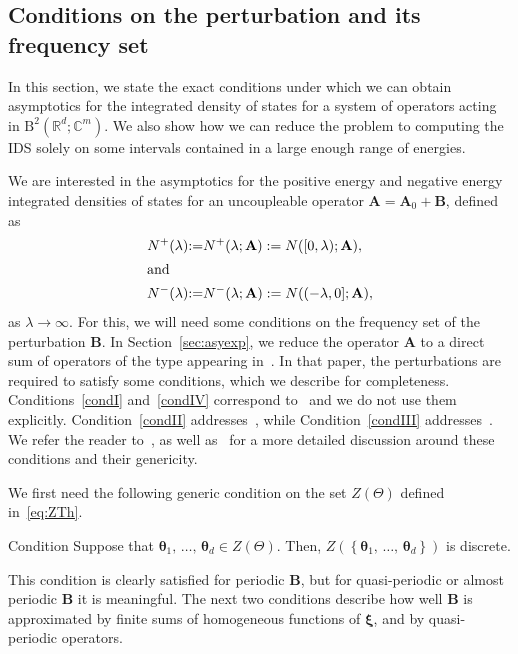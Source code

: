 \documentclass[10pt]{amsart}
\theoremstyle{definition}\newtheorem{defi}[theo]{Definition}\newtheorem{rema}[theo]{Remark}\newtheorem{exam}[theo]{Example}\newtheorem{nota}[theo]{Notation}
\newcommand{\RB}{\mathrm{B}}
\newcommand{\R}{\mathbb R}
\newcommand{\C}{\mathbb C}
\newcommand{\btheta}{\boldsymbol \theta}
\newcommand{\bxi}{\boldsymbol \xi}
\newcommand{\BA}{\mathbf A}
\newcommand{\BB}{\mathbf B}
\newcommand{\pd}{uncoupleable}
\newcommand{\set}[1]{\left\{ #1 \right\}}
\begin{document}
\subsection{Conditions on the perturbation and its frequency set}\label{sec:prelim}

In this section, we state the exact conditions under which we can obtain asymptotics for the integrated density of states for a system of operators acting in $\RB^2(\R^d;\C^m)$. We also show how we can reduce the problem to computing the IDS solely on some intervals contained in a large enough range of energies.


We are interested in the asymptotics for the positive energy and negative energy integrated densities of states for an \pd{} operator $\BA = \BA_0 + \BB$, defined as
\begin{align}
N^+(\lambda) &{:=} N^+(\lambda;\BA) := N([0,\lambda);\BA),\label{eq:npositive}
\\
\intertext{and}
N^-(\lambda) &{:=} N^-(\lambda;\BA) := N((-\lambda,0];\BA),\label{eq:nnegative}
\end{align}
as $\lambda \to \infty$. For this, we will need some conditions on the frequency set of the perturbation $\BB$. In Section~\ref{sec:asyexp}, we reduce the operator $\BA$ to a direct sum of operators of the type appearing in~\cite{MorParSht2014}. In that paper, the perturbations are required to satisfy some conditions, which we describe for completeness. Conditions~\ref{condI} and~\ref{condIV} correspond to~\cite[Conditions~A and~C]{MorParSht2014} and we do not use them explicitly. Condition~\ref{condII} addresses~\cite[equation 2.4]{MorParSht2014}, while Condition~\ref{condIII} addresses~\cite[Condition~B]{MorParSht2014}. We refer the reader to~\cite{MorParSht2014}, as well as~\cite{ParSht2012} for a more detailed discussion around these conditions and their genericity.

We first need the following generic condition on the set $Z(\Theta)$ defined in~\eqref{eq:ZTh}.

\begin{enonce}
{Condition}\label{condI}
Suppose that $\btheta_1,\,\dotsc,\,\btheta_d \in Z(\Theta)$. Then, $Z(\set{\btheta_1,\,\dotsc,\,\btheta_d})$ is discrete.
\end{enonce}

This condition is clearly satisfied for periodic $\BB$, but for quasi-periodic or almost periodic $\BB$ it is meaningful. The next two conditions describe how well $\BB$ is approximated by finite sums of homogeneous functions of $\bxi$, and by quasi-periodic operators.
\end{document}
